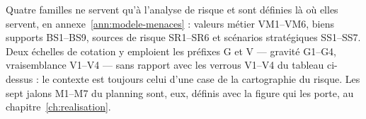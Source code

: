 \medskip
\noindent Quatre familles ne servent qu'à l'analyse de risque et sont définies là où elles servent,
en annexe~\ref{ann:modele-menaces} : valeurs métier VM1--VM6, biens supports BS1--BS9, sources de
risque SR1--SR6 et scénarios stratégiques SS1--SS7. Deux échelles de cotation y emploient les
préfixes G et V --- gravité G1--G4, vraisemblance V1--V4 --- sans rapport avec les verrous V1--V4
du tableau ci-dessus : le contexte est toujours celui d'une case de la cartographie du risque. Les
sept jalons M1--M7 du planning sont, eux, définis avec la figure qui les porte, au
chapitre~\ref{ch:realisation}.

\makeatletter
\patchcmd{\l@chapter}{\vskip 1.0em \@plus\p@}{\vskip 0.1em \@plus\p@}{}%
  {}
\makeatother

\clearpage
